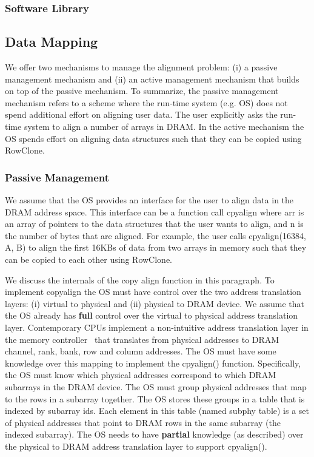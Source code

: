 \subsubsection{Software Library}

\subsection{Data Mapping}

We offer two mechanisms to manage the alignment problem: (i) a passive management mechanism and (ii) an active management mechanism that builds on top of the passive mechanism. To summarize, the passive management mechanism refers to a scheme where the run-time system (e.g. OS) does not spend additional effort on aligning user data. The user explicitly asks the run-time system to align a number of arrays in DRAM. In the active mechanism the OS spends effort on aligning data structures such that they can be copied using RowClone. 

\subsubsection{Passive Management}

We assume that the OS provides an interface for the user to align data in the DRAM address space. This interface can be a function call cpyalign where arr is an array of pointers to the data structures that the user wants to align, and n is the number of bytes that are aligned. For example, the user calls cpyalign(16384, A, B) to align the first 16KBs of data from two arrays in memory such that they can be copied to each other using RowClone.

We discuss the internals of the copy align function in this paragraph. To implement copyalign the OS must have control over the two address translation layers: (i) virtual to physical and (ii) physical to DRAM device. We assume that the OS already has \textbf{full} control over the virtual to physical address translation layer. Contemporary CPUs implement a non-intuitive address translation layer in the memory controller~\cite{X,Y,Z} that translates from physical addresses to DRAM channel, rank, bank, row and column addresses. The OS must have some knowledge over this mapping to implement the cpyalign() function. Specifically, the OS must know which physical addresses correspond to which DRAM subarrays in the DRAM device. The OS must group physical addresses that map to the rows in a subarray together. The OS stores these groups in a table that is indexed by subarray ids. Each element in this table (named subphy table) is a set of physical addresses that point to DRAM rows in the same subarray (the indexed subarray). The OS needs to have \textbf{partial} knowledge (as described) over the physical to DRAM address translation layer to support cpyalign(). 

